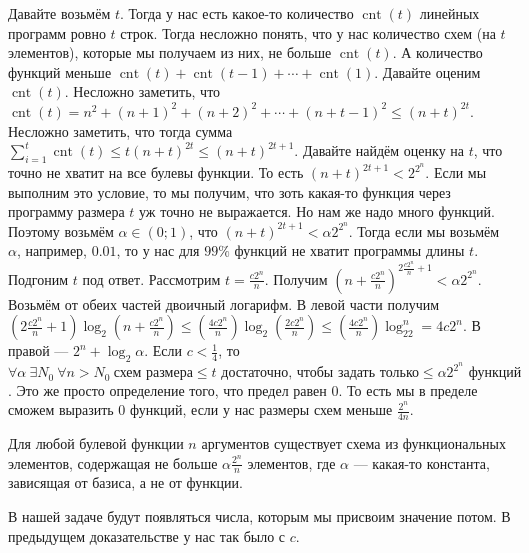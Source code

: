 \documentclass{article}
\begin{document}
\begin{itemize}
\begin{Proof}
            Давайте возьмём $t$. Тогда у нас есть какое-то количество $\operatorname{cnt}(t)$ линейных программ ровно $t$ строк. Тогда несложно понять, что у нас количество схем (на $t$ элементов), которые мы получаем из них, не больше $\operatorname{cnt}(t)$. А количество функций меньше $\operatorname{cnt}(t)+\operatorname{cnt}(t-1)+\cdots+\operatorname{cnt}(1)$. Давайте оценим $\operatorname{cnt}(t)$. Несложно заметить, что $\operatorname{cnt}(t)=n^2+(n+1)^2+(n+2)^2+\cdots+(n+t-1)^2\leqslant(n+t)^{2t}$. Несложно заметить, что тогда сумма $\sum\limits_{i=1}^t\operatorname{cnt}(t)\leqslant t(n+t)^{2t}\leqslant(n+t)^{2t+1}$. Давайте найдём оценку на $t$, что точно не хватит на все булевы функции. То есть $(n+t)^{2t+1}<2^{2^n}$. Если мы выполним это условие, то мы получим, что зоть какая-то функция через программу размера $t$  уж точно не выражается. Но нам же надо много функций. Поэтому возьмём $\alpha\in(0;1)$, что $(n+t)^{2t+1}<\alpha2^{2^n}$. Тогда если мы возьмём $\alpha$, например, $0.01$, то у нас для $99\%$ функций не хватит программы длины $t$. Подгоним $t$ под ответ. Рассмотрим $t=\frac{c2^n}{n}$. Получим $\left(n+\frac{c2^n}{n}\right)^{2\frac{c2^n}{n}+1}<\alpha2^{2^n}$. Возьмём от обеих частей двоичный логарифм. В левой части получим $\left(2\frac{c2^n}{n}+1\right)\log_2\left(n+\frac{c2^n}{n}\right)\leqslant\left(\frac{4c2^n}n\right)\log_2\left(\frac{2c2^n}n\right)\leqslant\left(\frac{4c2^n}n\right)\log_22^n=4c2^n$. В правой --- $2^n+\log_2\alpha$. Если $c<\frac14$, то $\forall\alpha~\exists N_0~\forall n>N_0~\text{схем размера}\leqslant t\text{ достаточно, чтобы задать только}\leqslant\alpha2^{2^n}\text{ функций}$. Это же просто определение того, что предел равен $0$. То есть мы в пределе сможем выразить 0 функций, если у нас размеры схем меньше $\frac{2^n}{4n}$.
        \end{Proof}
        \thm Для любой булевой функции $n$ аргументов существует схема из функциональных элементов, содержащая не больше $\alpha\frac{2^n}n$ элементов, где $\alpha$ --- какая-то константа, зависящая от базиса, а не от функции.
        \begin{Proof}
            В нашей задаче будут появляться числа, которым мы присвоим значение потом. В предыдущем доказательстве у нас так было с $c$.\\

\end{Proof}
\end{itemize}
\end{document}
